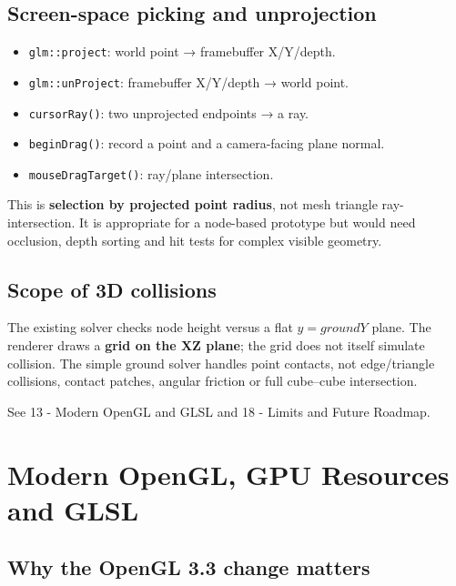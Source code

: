 \documentclass[
  10pt,
  a4paper,
]{article}
\providecommand{\tightlist}{%
  \setlength{\itemsep}{0pt}\setlength{\parskip}{0pt}}
\begin{document}
\subsection{Screen-space picking and
unprojection}\label{screen-space-picking-and-unprojection}

\begin{itemize}
\tightlist
\item
  \texttt{glm::project}: world point → framebuffer X/Y/depth.
\item
  \texttt{glm::unProject}: framebuffer X/Y/depth → world point.
\item
  \texttt{cursorRay()}: two unprojected endpoints → a ray.
\item
  \texttt{beginDrag()}: record a point and a camera-facing plane normal.
\item
  \texttt{mouseDragTarget()}: ray/plane intersection.
\end{itemize}

This is \textbf{selection by projected point radius}, not mesh triangle
ray-intersection. It is appropriate for a node-based prototype but would
need occlusion, depth sorting and hit tests for complex visible
geometry.

\subsection{Scope of 3D collisions}\label{scope-of-3d-collisions}

The existing solver checks node height versus a flat \(y=groundY\)
plane. The renderer draws a \textbf{grid on the XZ plane}; the grid does
not itself simulate collision. The simple ground solver handles point
contacts, not edge/triangle collisions, contact patches, angular
friction or full cube--cube intersection.

See 13 - Modern OpenGL and GLSL and 18 - Limits and Future Roadmap.

\newpage

\section{Modern OpenGL, GPU Resources and
GLSL}\label{modern-opengl-gpu-resources-and-glsl}

\subsection{Why the OpenGL 3.3 change
matters}\label{why-the-opengl-3.3-change-matters}
\end{document}
